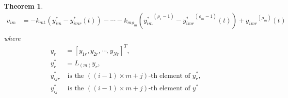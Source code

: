 \documentclass[11pt, a4paper, oneside, openany, reqno]{book}
\newtheorem{theorem}{Theorem}[chapter]
\theoremstyle{definition}
\theoremstyle{remark}
\numberwithin{equation}{chapter} %
\begin{document}
\begin{theorem}
\begin{equation}
\begin{split}
	v_{im}& = -k_{m1}(y_{im}^* - y_{imr}^* (t) ) - \cdots 
	- k_{m\rho_m} ({y_{im}^*}^{(\rho_1 -1)} - {y_{imr}^*}^{(\rho_m -1)} (t) ) + {y_{imr}}^{(\rho_m)} (t) \\
	\end{split}\end{equation} 	
	where 	
	\begin{equation}\begin{split}			
	y_r &= \left[ y_{1r}, y_{2r}, \cdots, y_{Nr} \right]^T, \\
	y_r^* &= L_{(m)}y_r, \\
	y_{ijr}^* &\text{ is the } ( (i-1) \times m + j)\text{-th element of } y_r^* ,\\
	y_{ij}^* &\text{ is the } ( (i-1) \times m + j)\text{-th element of } y^* \\	
	\end{split}\end{equation}
\end{theorem}
\end{document}
